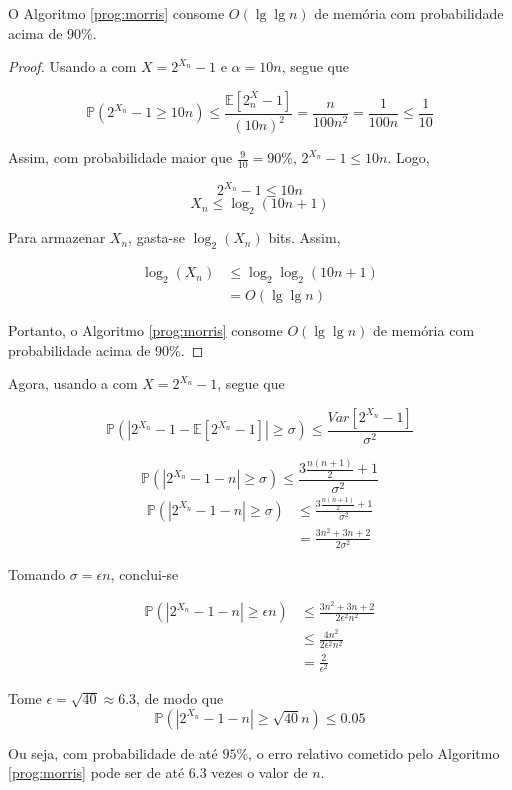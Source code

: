 \begin{lemma}
  O Algoritmo \ref{prog:morris} consome $O(\lg \lg n)$ de memória com probabilidade acima de $90\%$.
\end{lemma}

\begin{proof}
  Usando a  com $X = 2^{X_n} - 1$ e $\alpha = 10n$, segue que

\[ \mathbb{P}(2^{X_n} - 1 \geq 10n)  \leq \frac{\mathbb{E}[2^X_n - 1]}{(10n)^2} = \frac{n}{100n^2} = \frac{1}{100n} \leq \frac{1}{10} \]

Assim, com probabilidade maior que $\frac{9}{10} = 90\%$, $2^{X_n} - 1 \leq 10n$. Logo, 

\[ 2^{X_n} - 1 \leq 10n  \]
\[ X_n \leq \log_2(10n + 1)\]

Para armazenar $X_n$, gasta-se $\log_2(X_n)$ bits. Assim,

\begin{align*}
  \log_2(X_n) 
    &\leq \log_2\log_2(10n + 1) \\ 
    &= O(\lg \lg n)
\end{align*} 

Portanto, o Algoritmo \ref{prog:morris} consome $O(\lg \lg n)$ de memória com probabilidade acima de $90\%$.

\end{proof}


Agora, usando a  com $X = 2^{X_n} - 1$, segue que

\[ \mathbb{P}(|2^{X_n} - 1 - \mathbb{E}[2^{X_n} - 1]| \geq \sigma ) \leq \frac{Var[2^{X_n} - 1]}{\sigma^2}\]

\[ \mathbb{P}(|2^{X_n} - 1 - n| \geq \sigma ) \leq \frac{3\frac{n(n+1)}{2} + 1}{\sigma^2}\]
\begin{align*}
  \mathbb{P}(|2^{X_n} - 1 - n| \geq \sigma ) 
    &\leq \frac{3\frac{n(n+1)}{2} + 1}{\sigma^2}  \\
    &= \frac{3n^2 + 3n + 2}{2\sigma^2}
\end{align*}


Tomando $\sigma = \epsilon n$, conclui-se

\begin{align*}
  \mathbb{P}(|2^{X_n} - 1 - n| \geq \epsilon n) 
    &\leq \frac{3n^2 + 3n + 2}{2 \epsilon^2 n^2}  \\
    &\leq \frac{4n^2}{2 \epsilon^2 n^2}  \\
    &= \frac{2}{\epsilon^2}
\end{align*}

Tome $\epsilon = \sqrt{40} \approx 6.3 $, de modo que 
\[ \mathbb{P}(|2^{X_n} - 1 - n| \geq \sqrt{40} n)  \leq 0.05 \]

Ou seja, com probabilidade de até $95\%$, o erro relativo cometido pelo Algoritmo \ref{prog:morris} pode ser de até $6.3$ vezes o valor de $n$.
